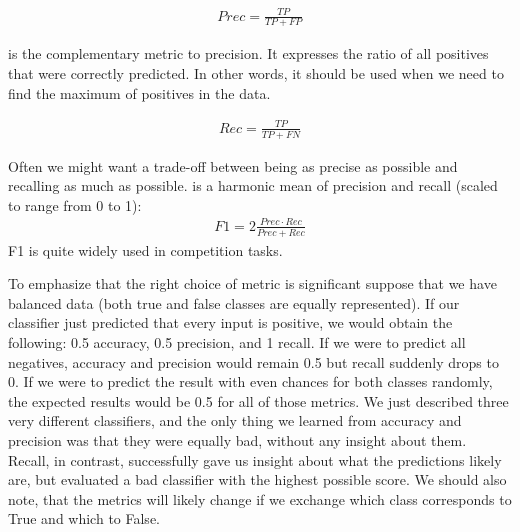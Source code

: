 \begin{align} 
Prec = \frac{TP}{TP + FP}
\end{align}

 is the complementary metric to precision. It expresses the ratio of all positives that were correctly predicted. In other words, it should be used when we need to find the maximum of positives in the data.

\begin{align}
Rec = \frac{TP}{TP + FN}
\end{align}

Often we might want a trade-off between being as precise as possible and recalling as much as possible.  is a harmonic mean of precision and recall (scaled to range from 0 to 1): \begin{align}
F1 = 2\frac{Prec \cdot Rec}{Prec + Rec}
\end{align}
F1 is quite widely used in competition tasks.






To emphasize that the right choice of metric is significant suppose that we have balanced data (both true and false classes are equally represented). If our classifier just predicted that every input is positive, we would obtain the following: 0.5 accuracy, 0.5 precision, and 1 recall. If we were to predict all negatives, accuracy and precision would remain 0.5 but recall suddenly drops to 0. If we were to predict the result with even chances for both classes randomly, the expected results would be 0.5 for all of those metrics. We just described three very different classifiers, and the only thing we learned from accuracy and precision was that they were equally bad, without any insight about them. Recall, in contrast, successfully gave us insight about what the predictions likely are, but evaluated a bad classifier with the highest possible score. We should also note, that the metrics will likely change if we exchange which class corresponds to True and which to False. 

